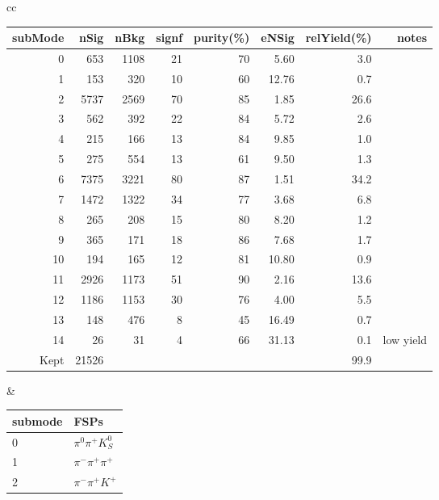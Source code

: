 \begin{table}[h!]
\begin{center}
\begin{tabular}{cc}

\begin{tabular}{|rrrrrrrr|}
\hline
subMode &  nSig &  nBkg &  signf&  purity(\%)&eNSig & relYield(\%)  & notes\\
\hline
0       &  653  & 1108  & 21    & 70        & 5.60  &   3.0         &   \\
1       &  153  &  320  & 10    & 60        & 12.76 &   0.7         &   \\
2       & 5737  & 2569  & 70    & 85        & 1.85  &  26.6         &   \\
3       &  562  &  392  & 22    & 84        & 5.72  &   2.6         &   \\
4       &  215  &  166  & 13    & 84        & 9.85  &   1.0         &   \\
5       &  275  &  554  & 13    & 61        & 9.50  &   1.3         &   \\
6       & 7375  & 3221  & 80    & 87        & 1.51  &  34.2         &   \\
7       & 1472  & 1322  & 34    & 77        & 3.68  &   6.8         &   \\
8       & 265   & 208   & 15    & 80        & 8.20  &   1.2         &   \\
9       & 365   & 171   & 18    & 86        & 7.68  &   1.7         &   \\
10      & 194   & 165   & 12    & 81        & 10.80 &   0.9         &   \\
11      & 2926  & 1173  & 51    & 90        & 2.16  &  13.6         &   \\
12      & 1186  & 1153  & 30    & 76        & 4.00  &   5.5         &   \\
13      & 148   & 476   & 8     & 45        & 16.49 &   0.7         &   \\
14      & 26    & 31    & 4     & 66        & 31.13 &   0.1         & low yield  \\
\hline
Kept&21526&&&&&99.9&\\
\hline
\end{tabular}
&
\begin{tabular}{|ll|}
\hline
submode& FSPs\\
\hline
0 & $\pi^0 \pi^+ K_S^0 $ \\
1 & $\pi^- \pi^+ \pi^+ $ \\
2 & $\pi^- \pi^+ K^+ $ \\

\end{tabular}
\end{tabular}
\end{center}
\end{table}
